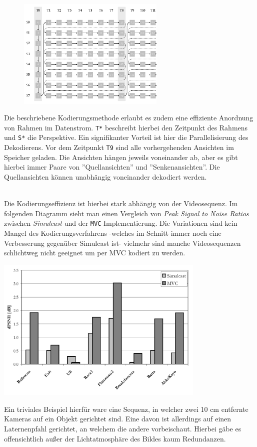 
\begin{figure}
    \includegraphics[width=7cm]{../img/encoding-memory}
\end{figure}

Die beschriebene Kodierungsmethode erlaubt es zudem eine effiziente Anordnung von Rahmen im Datenstrom.\cite{paper}
\texttt{T*} beschreibt hierbei den Zeitpunkt des Rahmens und \texttt{S*} die Perspektive.
Ein signifikanter Vorteil ist hier die Parallelisierung des Dekodierens.
Vor dem Zeitpunkt \texttt{T9} sind alle vorhergehenden Ansichten im Speicher geladen.
Die Ansichten h\"angen jeweils voneinander ab, aber es gibt hierbei immer Paare von ''Quellansichten'' und
''Senkenansichten''.
Die Quellansichten k\"onnen unabh\"angig voneinander dekodiert werden.

\noindent\\ Die Kodierungseffizienz ist hierbei stark abh\"angig von der Videosequenz.\cite{paper}
Im folgenden Diagramm sieht man einen Vergleich von \textit{Peak Signal to Noise Ratios} zwischen \textit{Simulcast}
und der \texttt{MVC}-Implementierung.
Die Variationen sind kein Mangel des Kodierungsverfahrens -welches im Schnitt immer noch eine Verbesserung gegen\"uber
Simulcast ist- vielmehr sind manche Videosequenzen schlichtweg nicht geeignet um per MVC kodiert zu werden.

\begin{center}
    \includegraphics[width=0.75\textwidth]{../img/encoding-efficiency}
\end{center}
\noindent Ein triviales Beispiel hierf\"ur ware eine Sequenz, in welcher zwei 10 cm entfernte Kameras auf ein Objekt
gerichtet sind.
Eine davon ist allerdings auf einen Laternenpfahl gerichtet, an welchem die andere vorbeischaut.
Hierbei g\"abe es offensichtlich au{\ss}er der Lichtatmosph\"are des Bildes kaum Redundanzen.
